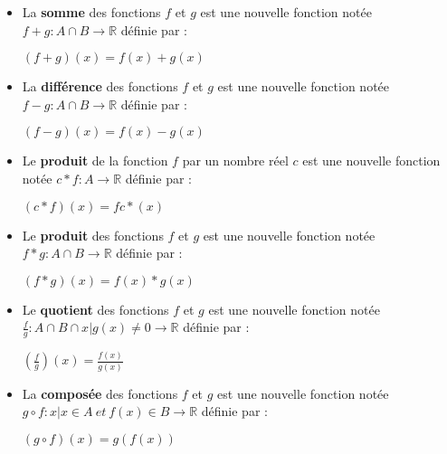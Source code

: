 \documentclass[12pt, a4paper]{book}
\begin{document}
\begin{itemize}
    \item  La \textbf{somme} des fonctions $f$ et $g$ est une nouvelle fonction notée $f+g : A \cap B \rightarrow \mathbb{R}$ définie par :
    \begin{center}
        $(f + g)(x) = f(x)+g(x)$
    \end{center} 
   
    \item  La \textbf{différence} des fonctions $f$ et $g$ est une nouvelle fonction notée $f-g : A \cap B \rightarrow \mathbb{R}$ définie par :
    \begin{center}
        $(f - g)(x) = f(x)-g(x)$
    \end{center} 

    \item  Le \textbf{produit} de la fonction $f$ par un nombre réel $c$ est une nouvelle fonction notée $c*f : A \rightarrow \mathbb{R}$ définie par :
    \begin{center}
        $(c*f)(x) = fc*(x)$
    \end{center} 
    \item  Le \textbf{produit} des fonctions $f$ et $g$ est une nouvelle fonction notée $f*g : A \cap B \rightarrow \mathbb{R}$ définie par :
    \begin{center}
        $(f * g)(x) = f(x)*g(x)$
    \end{center} 

    \item  Le \textbf{quotient} des fonctions $f$ et $g$ est une nouvelle fonction notée $\frac{f}{g} : A \cap B \cap {x | g(x) \not = 0} \rightarrow \mathbb{R}$ définie par :
    \begin{center}
        $(\frac{f}{g})(x) = \frac{f(x)}{g(x)}$
    \end{center} 

    \item  La \textbf{composée} des fonctions $f$ et $g$ est une nouvelle fonction notée $g \circ f : {x|x \in A \ et \ f(x) \in B} \rightarrow \mathbb{R}$ définie par :
    \begin{center}
        $(g \circ f)(x) = g(f(x))$
    \end{center} 
\end{itemize}
\newpage
\end{document}

